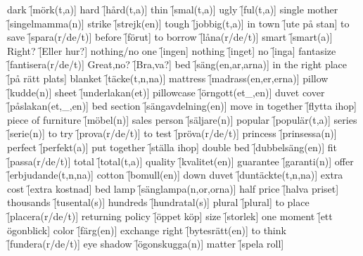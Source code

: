 \begin{questions}
\begin{multicols}{2}
        \question dark \f[mörk(t,a)]
        \question hard \f[hård(t,a)]
        \question thin \f[smal(t,a)]
        \question ugly \f[ful(t,a)]
        \question single mother \f[singelmamma(n)]
        \question strike \f[strejk(en)]
        \question tough \f[jobbig(t,a)]
        \question in town \f[ute på stan]
        \question to save \f[spara(r/de/t)]
        \question before \f[förut]
        \question to borrow \f[låna(r/de/t)]
        \question smart \f[smart(a)]
        \question Right? \f[Eller hur?]
        \question nothing/no one \f[ingen]
        \question nothing \f[inget]
        \question no \f[inga]
        \question fantasize \f[fantisera(r/de/t)]
        \question Great,no? \f[Bra,va?]
        \question bed \f[säng(en,ar,arna)]
        \question in the right place \f[på rätt plats]
        \question blanket \f[täcke(t,n,na)]
        \question mattress \f[madrass(en,er,erna)]
        \question pillow \f[kudde(n)]
        \question sheet \f[underlakan(et)]
        \question pillowcase \f[örngott(et\_,en)]
        \question duvet cover \f[påslakan(et,\_,en)]
        \question bed section \f[sängavdelning(en)]
        \question move in together \f[flytta ihop]
        \question piece of furniture \f[möbel(n)]
        \question sales person \f[säljare(n)]
        \question popular \f[populär(t,a)]
        \question series \f[serie(n)]
        \question to try \f[prova(r/de/t)]
        \question to test \f[pröva(r/de/t)]
        \question princess \f[prinsessa(n)]
        \question perfect \f[perfekt(a)]
        \question put together \f[ställa ihop]
        \question double bed \f[dubbelsäng(en)]
        \question fit \f[passa(r/de/t)]
        \question total \f[total(t,a)]
        \question quality \f[kvalitet(en)]
        \question guarantee \f[garanti(n)]
        \question offer \f[erbjudande(t,n,na)]
        \question cotton \f[bomull(en)]
        \question down duvet \f[duntäckte(t,n,na)]
        \question extra cost \f[extra kostnad]
        \question bed lamp \f[sänglampa(n,or,orna)]
        \question half price \f[halva priset]
        \question thousands \f[tusental(s)]
        \question hundreds \f[hundratal(s)]
        \question plural \f[plural]
        \question to place \f[placera(r/de/t)]
        \question returning policy \f[öppet köp]
        \question size \f[storlek]
        \question one moment \f[ett ögonblick]
        \question color \f[färg(en)]
        \question exchange right \f[bytesrätt(en)]
        \question to think \f[fundera(r/de/t)]
        \question eye shadow \f[ögonskugga(n)]
        \question matter \f[spela roll]

\end{multicols}
\end{questions}
